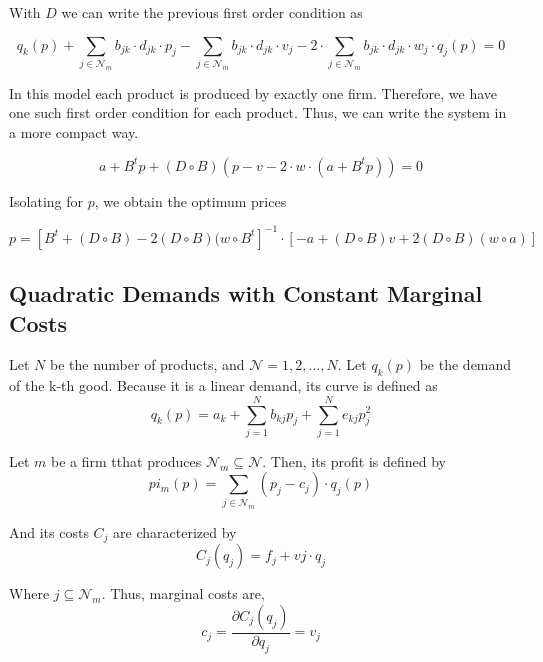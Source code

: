 \documentclass[12pt]{article}
\begin{document}
With $D$ we can write the previous first order condition as

\begin{equation*}
q_k(p) + \sum_{j \in \mathcal{N}_m} b_{jk} \cdot d_{jk} \cdot p_j - \sum_{j \in \mathcal{N}_m} b_{jk} \cdot d_{jk} \cdot v_j - 2 \cdot \sum_{j \in \mathcal{N}_m} b_{jk} \cdot d_{jk} \cdot w_j \cdot q_j (p) = 0
\end{equation*}

In this model each product is produced by exactly one firm. Therefore, we have one such first order condition for each product. Thus, we can write the system in a more compact way.

\begin{equation*}
a + B ^ t p + (D \circ B)(p - v - 2 \cdot w \cdot (a + B^t p)) = 0
\end{equation*}

Isolating for $p$, we obtain the optimum prices

\begin{equation*}
p = [B^t + (D \circ B) - 2 (D \circ B)(w \circ B^t]^{-1} \cdot [-a + (D \circ B) v + 2 (D \circ B)(w \circ a)]
\end{equation*}

\subsection{Quadratic Demands with Constant Marginal Costs}

Let $N$ be the number of products, and $\mathcal{N} = {1, 2, ..., N}.$
Let $q_k(p)$ be the demand of the k-th good. Because it is a linear demand, its curve is defined as 
\begin{equation*}
q_k(p) = a_k + \sum_{j=1}^N b_{kj}p_j + \sum_{j=1}^N e_{kj} p_j^2
\end{equation*}

Let $m$ be a firm tthat produces $\mathcal{N}_m \subseteq \mathcal{N}$. Then, its profit is defined by
\begin{equation*}
pi_m(p) = \sum_{j \in \mathcal{N}_m} (p_j - c_j) \cdot q_j(p)
\end{equation*}

And its costs $C_j$ are characterized by 
\begin{equation*}
C_j(q_j) = f_j + vj \cdot q_j
\end{equation*}

Where $j \subseteq \mathcal{N}_m$. Thus, marginal costs are,
\begin{equation*}
c_j = \frac{\partial C_j(q_j)}{\partial q_j} = v_j
\end{equation*}
\end{document}
